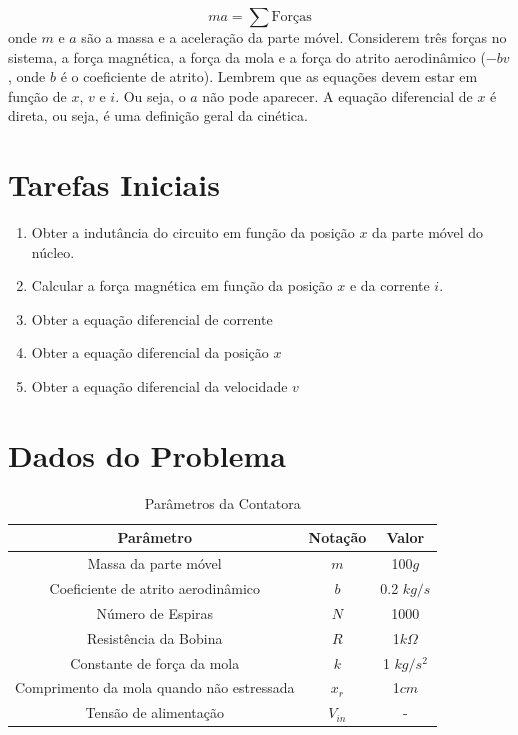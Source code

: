 \documentclass[a4paper]{article}
\theoremstyle{definition}
\theoremstyle{plain}
\begin{document}
\begin{equation}
m a = \displaystyle \sum \text{Forças}
\end{equation}
%
onde $m$ e $a$ são a massa e a aceleração da parte móvel. Considerem três forças no sistema, a força magnética, a força da mola e a força do atrito aerodinâmico ($-b v$, onde $b$ é o coeficiente de atrito). Lembrem que as equações devem estar em função de $x$, $v$ e $i$. Ou seja, o $a$ não pode aparecer. A equação diferencial de $x$ é direta, ou seja, é uma definição geral da cinética. 



\section{Tarefas Iniciais}


\begin{enumerate}
	\item Obter a indutância do circuito em função da posição $x$ da parte móvel do núcleo.
	\item Calcular a força magnética em função da posição $x$ e da corrente $i$.
	\item Obter a equação diferencial de corrente
	\item Obter a equação diferencial da posição $x$
	\item Obter a equação diferencial da velocidade $v$
\end{enumerate}





\section{Dados do Problema}





\begin{table}[H]
\centering
\caption{Parâmetros da Contatora}
\begin{tabular}{ccc}
\hline
\textbf{Parâmetro} & \textbf{Notação} & \textbf{Valor}\\ \hline
Massa da parte móvel & $m$ & 100$g$\\
Coeficiente de atrito aerodinâmico & $b$ & 0.2 $kg/s$\\
Número de Espiras & $N$ & 1000\\
Resistência da Bobina & $R$ & 1$k\Omega$\\
Constante de força da mola & $k$ & 1 $kg/s^2$\\ 
Comprimento da mola quando não estressada & $x_r$ & 1$cm$\\ 
Tensão de alimentação & $V_{in}$ & -\\ 
\hline
\end{tabular}
\end{table}
\end{document}
